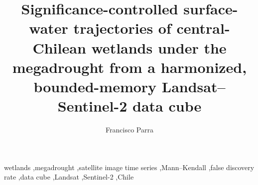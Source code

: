 \documentclass[review]{elsarticle}
\begin{document}
\begin{frontmatter}

\title{Significance-controlled surface-water trajectories of central-Chilean
wetlands under the megadrought from a harmonized, bounded-memory
Landsat--Sentinel-2 data cube}

\author[usach]{Francisco Parra}
\address[usach]{Universidad de Santiago de Chile (USACH), Santiago, Chile}

\begin{abstract}
\end{abstract}

\begin{highlights}
\item %
\item %
\item %
\item %
\item %
\end{highlights}

\begin{keyword}
wetlands \sep megadrought \sep satellite image time series \sep Mann--Kendall
\sep false discovery rate \sep data cube \sep Landsat \sep Sentinel-2 \sep Chile
\end{keyword}
\end{frontmatter}
\end{document}
